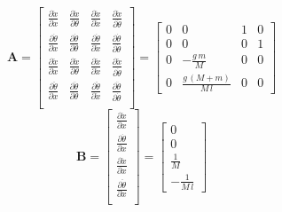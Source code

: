 \documentclass{article}
\begin{document}
\begin{equation}
    \boldsymbol{A} = \begin{bmatrix}
        \frac{\partial \dot{x}}{\partial x} &
        \frac{\partial \dot{x}}{\partial \theta} &
        \frac{\partial \dot{x}}{\partial \dot{x}} &
        \frac{\partial \dot{x}}{\partial \dot{\theta}}
        \\[4pt]
        \frac{\partial \dot{\theta}}{\partial x} &
        \frac{\partial \dot{\theta}}{\partial \theta} &
        \frac{\partial \dot{\theta}}{\partial \dot{x}} &
        \frac{\partial \dot{\theta}}{\partial \dot{\theta}}
        \\[4pt]
        \frac{\partial \ddot{x}}{\partial x} &
        \frac{\partial \ddot{x}}{\partial \theta} &
        \frac{\partial \ddot{x}}{\partial \dot{x}} &
        \frac{\partial \ddot{x}}{\partial \dot{\theta}} 
        \\[4pt]
        \frac{\partial \ddot{\theta}}{\partial x} &
        \frac{\partial \ddot{\theta}}{\partial \theta} &
        \frac{\partial \ddot{\theta}}{\partial \dot{x}} &
        \frac{\partial \ddot{\theta}}{\partial \dot{\theta}}
        \\[4pt]
    \end{bmatrix}
    =
    \begin{bmatrix}
        0 & 0 & 1 & 0\\
        0 & 0 & 0 & 1\\[4pt]
        0 & -\frac{g\,m}{M} & 0 & 0\\[4pt]
        0 & \frac{g\,{\left(M+m\right)}}{M\,l} & 0 & 0
    \end{bmatrix}
\end{equation}
\begin{equation}
    \boldsymbol{B} = \begin{bmatrix}
        \frac{\partial \dot{x}}{\partial x}
        \\[4pt]
        \frac{\partial \dot{\theta}}{\partial x}
        \\[4pt]
        \frac{\partial \ddot{x}}{\partial x}
        \\[4pt]
        \frac{\partial \ddot{\theta}}{\partial x}
        \\[4pt]
    \end{bmatrix}
    =
    \begin{bmatrix}
        0\\
        0\\[4pt]
        \frac{1}{M}\\[4pt]
        -\frac{1}{M\,l}
    \end{bmatrix}
\end{equation}
\end{document}
